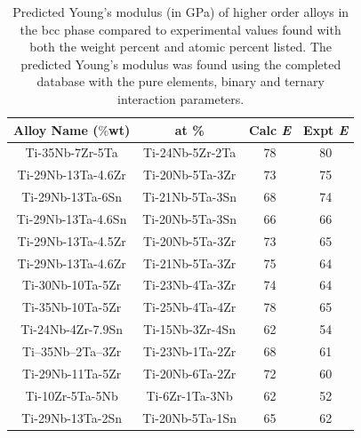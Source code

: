 \newpage
\begin{table}[H]
	\caption{Predicted Young's modulus (in GPa) of higher order alloys in the bcc phase compared to experimental values found with both the weight percent and atomic percent listed. The predicted Young's modulus was found using the completed database with the pure elements, binary and ternary interaction parameters.}
	\centering
	\begin{tabular}{ c c c c }
		\hline
		Alloy Name ($\%$wt) & at \% & Calc \textit{E} & Expt \textit{E}\\
		\hline
		Ti-35Nb-7Zr-5Ta \cite{Geetha2009} & Ti-24Nb-5Zr-2Ta & 78 & 80\\
		Ti-29Nb-13Ta-4.6Zr \cite{Geetha2009}  & Ti-20Nb-5Ta-3Zr & 73 & 75\\
		Ti-29Nb-13Ta-6Sn \cite{Geetha2009} & Ti-21Nb-5Ta-3Sn & 68 & 74\\
		Ti-29Nb-13Ta-4.6Sn \cite{Geetha2009} & Ti-20Nb-5Ta-3Sn & 66 & 66\\
		Ti-29Nb-13Ta-4.5Zr \cite{Geetha2009} & Ti-20Nb-5Ta-3Zr & 73 & 65\\
		Ti-29Nb-13Ta-4.6Zr \cite{Tane2010a} & Ti-21Nb-5Ta-3Zr & 75 & 64\\
		Ti-30Nb-10Ta-5Zr \cite{Tane2010a} & Ti-23Nb-4Ta-3Zr & 74 & 64\\
		Ti-35Nb-10Ta-5Zr \cite{Tane2010a} & Ti-25Nb-4Ta-4Zr & 78 & 65\\
		Ti-24Nb-4Zr-7.9Sn \cite{Mohammed2014} & Ti-15Nb-3Zr-4Sn & 62 & 54\\
		Ti–35Nb–2Ta–3Zr \cite{Mohammed2014} & Ti-23Nb-1Ta-2Zr & 68 & 61\\
		Ti-29Nb-11Ta-5Zr \cite{Mohammed2014} & Ti-20Nb-6Ta-2Zr & 72 & 60\\
		Ti-10Zr-5Ta-5Nb \cite{Mohammed2014} & Ti-6Zr-1Ta-3Nb & 62 & 52\\
		Ti-29Nb-13Ta-2Sn \cite{Mohammed2014} & Ti-20Nb-5Ta-1Sn & 65 & 62\\
		\hline
	\end{tabular}
	\label{Ch6-table:tixydatacomp}
\end{table}
\clearpage

